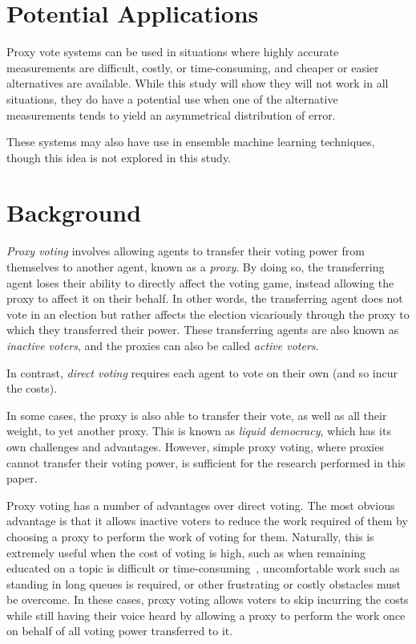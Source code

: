 \section{Potential Applications}\label{sec:potential-applications}
Proxy vote systems can be used in situations where highly accurate measurements are
difficult, costly, or time-consuming, and cheaper or easier alternatives are available.
While this study will show they will not work in all situations, they do have a
potential use when one of the alternative measurements tends to yield an asymmetrical
distribution of error.

These systems may also have use in ensemble machine learning techniques, though this
idea is not explored in this study.


\section{Background}\label{sec:background}
\textit{Proxy voting} involves allowing agents to transfer their voting power
from themselves to another agent, known as a \textit{proxy}\cite[para.~1.4]
{Cohensius2017}.
By doing so, the transferring agent loses their ability to directly affect the
voting game, instead allowing the proxy to affect it on their behalf.
In other words, the transferring agent does not vote in an election but rather
affects the election vicariously through the proxy to which they transferred
their power.
These transferring agents are also known as \textit{inactive voters}, and the
proxies can also be called \textit{active voters}.

In contrast, \textit{direct voting} requires each agent to vote on their own
(and so incur the costs).

In some cases, the proxy is also able to transfer their vote, as well as all
their weight, to yet another proxy.
This is known as \textit{liquid democracy}, which has its own challenges and
advantages.
However, simple proxy voting, where proxies cannot transfer their voting power,
is sufficient for the research performed in this paper.

Proxy voting has a number of advantages over direct voting.
The most obvious advantage is that it allows inactive voters to reduce the work
required of them by choosing a proxy to perform the work of voting for them.
Naturally, this is extremely useful when the cost of voting is high, such as
when remaining educated on a topic is difficult or
time-consuming~\cite[para.~1.1]{Mueller1972}, uncomfortable work such as
standing in long queues is required, or other frustrating or costly obstacles
must be overcome.
In these cases, proxy voting allows voters to skip incurring the costs while
still having their voice heard by allowing a proxy to perform the work once on
behalf of all voting power transferred to it.

